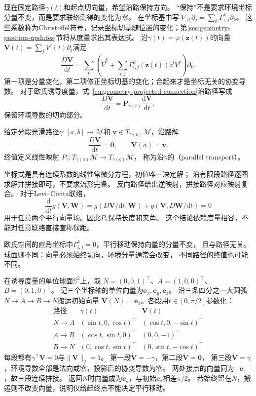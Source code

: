 现在固定路径$\gamma(t)$和起点切向量，希望沿路保持方向。
“保持”不是要求环境坐标分量不变，而是要求联络测得的变化为零。
在坐标基中写
$\nabla_{\partial_i}\partial_j=\sum_k\Gamma^k_{i,j}\partial_k$。
这些系数称为Christoffel符号，记录坐标切基随位置的变化；第\ref{sec:geometry-position-updates}节将从度量求出其表达式。
沿$\gamma(t)=\varphi(\bm z(t))$的向量
$\bm V(t)=\sum_jV^j(t)\partial_j$满足
\begin{equation}
 \frac{D\bm V}{\mathrm dt}
 =\sum_k\left(\dot V^k+
     \sum_{i,j}\Gamma^k_{i,j}(\bm z(t))\dot z^iV^j\right)\partial_k.
 \label{eq:geometry-covariant-derivative-along-path}
\end{equation}
第一项是分量变化，第二项修正坐标切基的变化；合起来才是坐标无关的协变导数。
对于欧氏诱导度量，式~\eqref{eq:geometry-projected-connection}沿路径写成
\[
 \frac{D\bm V}{\mathrm dt}
 =\bm P_{\gamma(t)}\frac{\mathrm d\bm V}{\mathrm dt},
\]
保留环境导数的切向部分。

\begin{definition}[平行移动]
\label{def:geometry-parallel-transport}
给定分段光滑路径$\gamma:[a,b]\to\mathcal M$和
$\bm v\in T_{\gamma(a)}\mathcal M$，沿路解
\[
 \frac{D\bm V}{\mathrm dt}=\bm0,\qquad \bm V(a)=\bm v.
\]
终值定义线性映射
$P_\gamma:T_{\gamma(a)}\mathcal M\to T_{\gamma(b)}\mathcal M$，
称为沿$\gamma$的（parallel transport）。
\end{definition}
坐标式是具有连续系数的线性常微分方程，初值唯一决定解；
沿有限段路径逐图求解并拼接即可，不要求流形完备。
反向路径给出逆映射，拼接路径对应映射复合。
对于Levi--Civita联络，
\[
 \frac{\mathrm d}{\mathrm dt}g(\bm V,\bm W)
 =g(D\bm V/\mathrm dt,\bm W)+g(\bm V,D\bm W/\mathrm dt)=0
\]
用于任意两个平行向量场。因此$P_\gamma$保持长度和夹角。
这个结论依赖度量相容，不能对任意联络直接宣称保距。

欧氏空间的直角坐标中$\Gamma^k_{i,j}=0$，平行移动保持向量的分量不变，
且与路径无关。球面则不同：向量必须始终切向，环境分量通常会改变，
不同路径的终值也可能不同。

\begin{example}[球面三段路径上的方向搬运]
\label{ex:geometry-sphere-parallel-transport}
在诱导度量的单位球面$\mathbb S^2$上，取
$N=(0,0,1)^\top$、$A=(1,0,0)^\top$、$B=(0,1,0)^\top$。
记三个坐标轴的单位向量为$\bm e_x,\bm e_y,\bm e_z$。
沿三条四分之一大圆弧$N\to A\to B\to N$搬运初始向量
$\bm V(N)=\bm e_x$。各段用$t\in[0,\pi/2]$参数化：
\[
 \begin{array}{c|c|c}
  \text{路径}&\gamma(t)&\bm V(t)\\ \hline
  N\to A&(\sin t,0,\cos t)^\top&(\cos t,0,-\sin t)^\top\\
  A\to B&(\cos t,\sin t,0)^\top&(0,0,-1)^\top\\
  B\to N&(0,\cos t,\sin t)^\top&(0,\sin t,-\cos t)^\top
 \end{array}
\]
每段都有$\gamma^\top\bm V=0$与$\lVert\bm V\rVert_2=1$。
第一段$\dot{\bm V}=-\gamma$，第二段$\dot{\bm V}=\bm0$，
第三段$\dot{\bm V}=\gamma$，环境导数全部是法向或零，投影后的协变导数为零。
两处接点的向量同为$-\bm e_z$，故三段连续拼接。
返回$N$时向量成为$\bm e_y$，与初始$\bm e_x$相差$\pi/2$。
若始终留在$N$，搬运则不改变向量，说明仅给起终点不能决定平行移动。
\end{example}

